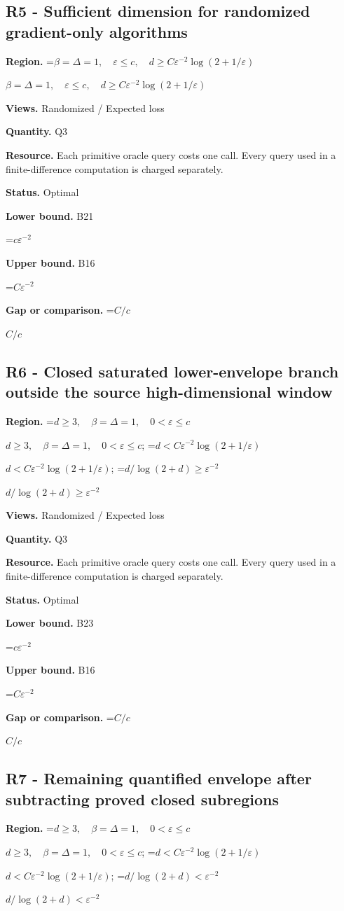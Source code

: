 \documentclass[10pt,a4paper]{article}
\newcommand{\AtlasMath}[1]{\par\begingroup\centering\setbox0=\hbox{$\displaystyle #1$}\ifdim\wd0>1.4\linewidth\typeout{ATLAS WIDE FORMULA: \the\wd0}\fi\ifdim\wd0>\linewidth\resizebox{\linewidth}{!}{\box0}\else\box0\fi\par\endgroup}
\newcommand{\AtlasInlineMath}[1]{\begingroup\setbox0=\hbox{$#1$}\ifdim\wd0>.4\linewidth\endgroup\AtlasMath{#1}\else\endgroup$#1$\fi}
\begin{document}
\subsection{R5 - Sufficient dimension for randomized gradient-only algorithms}
\textbf{Region.} \AtlasInlineMath{\beta=\Delta=1,\quad\varepsilon\le c,\quad d\ge C\varepsilon^{-2}\log(2+1/\varepsilon)}

\textbf{Views.} Randomized / Expected loss

\textbf{Quantity.} Q3

\textbf{Resource.} Each primitive oracle query costs one call. Every query used in a finite-difference computation is charged separately.

\textbf{Status.} Optimal

\textbf{Lower bound.} B21

\AtlasMath{c\varepsilon^{-2}}
\textbf{Upper bound.} B16

\AtlasMath{C\varepsilon^{-2}}
\textbf{Gap or comparison.} \AtlasInlineMath{C/c}

\subsection{R6 - Closed saturated lower-envelope branch outside the source high-dimensional window}
\textbf{Region.} \AtlasInlineMath{d\ge3,\quad\beta=\Delta=1,\quad0<\varepsilon\le c}; \AtlasInlineMath{d<C\varepsilon^{-2}\log(2+1/\varepsilon)}; \AtlasInlineMath{d/\log(2+d)\ge\varepsilon^{-2}}

\textbf{Views.} Randomized / Expected loss

\textbf{Quantity.} Q3

\textbf{Resource.} Each primitive oracle query costs one call. Every query used in a finite-difference computation is charged separately.

\textbf{Status.} Optimal

\textbf{Lower bound.} B23

\AtlasMath{c\varepsilon^{-2}}
\textbf{Upper bound.} B16

\AtlasMath{C\varepsilon^{-2}}
\textbf{Gap or comparison.} \AtlasInlineMath{C/c}

\subsection{R7 - Remaining quantified envelope after subtracting proved closed subregions}
\textbf{Region.} \AtlasInlineMath{d\ge3,\quad\beta=\Delta=1,\quad0<\varepsilon\le c}; \AtlasInlineMath{d<C\varepsilon^{-2}\log(2+1/\varepsilon)}; \AtlasInlineMath{d/\log(2+d)<\varepsilon^{-2}}
\end{document}
